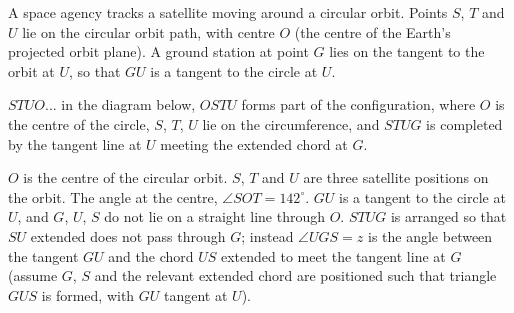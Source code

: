 \begin{question}
\noindent A space agency tracks a satellite moving around a circular orbit. Points $S$, $T$ and $U$ lie on the circular orbit path, with centre $O$ (the centre of the Earth's projected orbit plane). A ground station at point $G$ lies on the tangent to the orbit at $U$, so that $GU$ is a tangent to the circle at $U$.

$STUO$... in the diagram below, $OSTU$ forms part of the configuration, where $O$ is the centre of the circle, $S$, $T$, $U$ lie on the circumference, and $STUG$ is completed by the tangent line at $U$ meeting the extended chord at $G$.

\begin{center}
\end{center}

\noindent $O$ is the centre of the circular orbit. $S$, $T$ and $U$ are three satellite positions on the orbit. The angle at the centre, $\angle SOT = 142^\circ$. $GU$ is a tangent to the circle at $U$, and $G$, $U$, $S$ do not lie on a straight line through $O$. $STUG$ is arranged so that $SU$ extended does not pass through $G$; instead $\angle UGS = z$ is the angle between the tangent $GU$ and the chord $US$ extended to meet the tangent line at $G$ (assume $G$, $S$ and the relevant extended chord are positioned such that triangle $GUS$ is formed, with $GU$ tangent at $U$).


\end{question}
